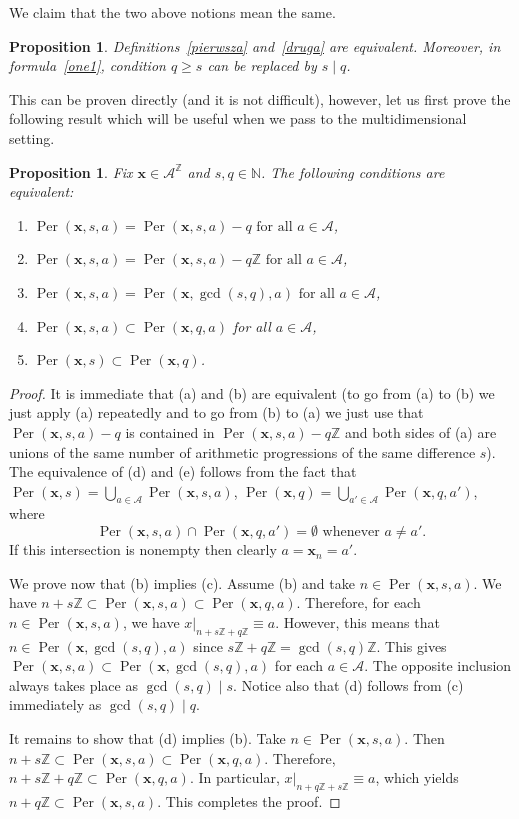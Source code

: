 \documentclass[leqno,a4paper,12pt]{article}
\newtheorem{Prop}[Th]{Proposition}
\theoremstyle{definition}
\newcommand{\divides}{\mid}
\newcommand{\Per}{\operatorname{Per}\nolimits}
\newcommand{\Z}{{\mathbb{Z}}}
\begin{document}
We claim that the two above notions mean the same.
\begin{Prop}\label{twierd}
Definitions~\ref{pierwsza} and~\ref{druga} are equivalent. Moreover, in formula~\eqref{one1}, condition $q\geq s$ can be replaced by $s\divides q$.
\end{Prop}
This can be proven directly (and it is not difficult), however, let us first prove the following result which will be useful when we pass to the multidimensional setting.
\begin{Prop}\label{equiv_cond}
Fix $\bm{x}\in\mathcal{A}^\Z$ and $s,q\in \mathbb{N}$. The following conditions are equivalent:
\begin{enumerate}
\item[(a)]
$\Per(\bm{x},s,a)=\Per(\bm{x},s,a)-q \text{ for all }a\in\mathcal{A}$,
\item[(b)]
$\Per(\bm{x},s,a)=\Per(\bm{x},s,a)-q\mathbb{Z} \text{ for all }a\in\mathcal{A}$,
\item[(c)]
$\Per(\bm{x},s,a)=\Per(\bm{x},\gcd(s,q),a)\text{ for all }a\in \mathcal{A}$,
\item[(d)]
$\Per(\bm{x},s,a)\subset \Per(\bm{x},q,a)$ for all $a\in \mathcal{A}$,
\item[(e)]
$\Per(\bm{x},s)\subset \Per(\bm{x},q)$.
\end{enumerate}
\end{Prop}
\begin{proof}
It is immediate that (a) and (b) are equivalent (to go from (a) to (b) we just apply (a) repeatedly and to go from (b) to (a) we just use that $\Per(\bm{x},s,a)-q$ is contained in $\Per(\bm{x},s,a)-q\mathbb{Z}$ and both sides of (a) are unions of the same number of arithmetic progressions of the same difference $s$). The equivalence of (d) and (e) follows from the fact that $\Per(\bm{x},s)=\bigcup_{a\in\mathcal{A}}\Per(\bm{x},s,a)$, $\Per(\bm{x},q)=\bigcup_{a'\in\mathcal{A}}\Per(\bm{x},q,a')$, where
\[
\Per(\bm{x},s,a)\cap\Per(\bm{x},q,a')=\emptyset \text{ whenever }a\neq a'.
\]
If this intersection is nonempty then clearly $a=\bm{x}_n=a'$.

We prove now that (b) implies (c). Assume (b) and take $n\in \Per(\bm{x},s,a)$. We have $n+s\Z\subset \Per(\bm{x},s,a)\subset \Per(\bm{x},q,a)$. Therefore, for each $n\in \Per(\bm{x},s,a)$, we have $x|_{n+s\Z+q\Z}\equiv a$. However, this means that $n\in \Per(\bm{x},\gcd(s,q),a)$ since $s\Z+q\Z=\gcd(s,q)\Z$. This gives $\Per(\bm{x},s,a)\subset \Per(\bm{x},\gcd(s,q),a)$ for each $a\in \mathcal{A}$. The opposite inclusion always takes place as $\gcd(s,q)\divides s$. Notice also that (d) follows from (c) immediately as $\gcd(s,q)\divides q$.

It remains to show that (d) implies (b). Take $n\in\Per(\bm{x},s,a)$. Then $n+s\Z\subset \Per(\bm{x},s,a)\subset \Per(\bm{x},q,a)$. Therefore, $n+s\Z+q\Z\subset \Per(\bm{x},q,a)$. In particular, $x|_{n+q\Z+s\Z}\equiv a$, which yields $n+q\Z\subset \Per(\bm{x},s,a)$. This completes the proof.
\end{proof}
\end{document}
